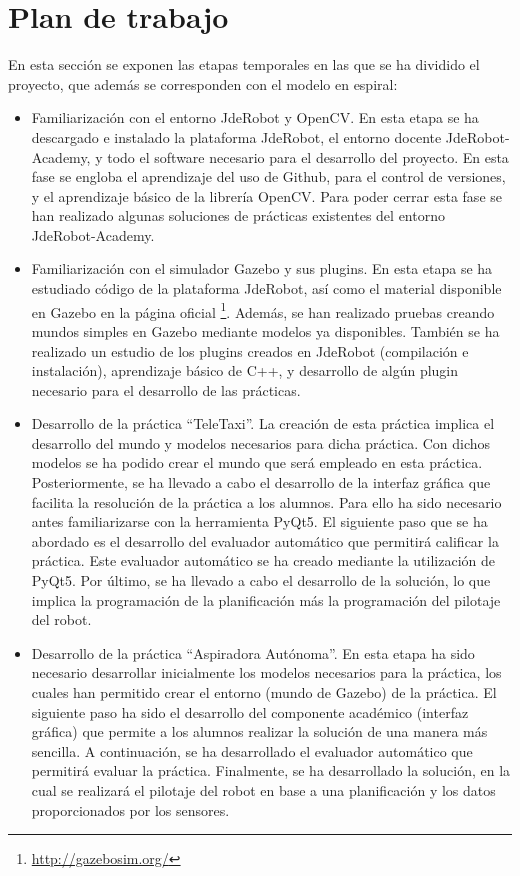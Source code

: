 \section{Plan de trabajo}
En esta sección se exponen las etapas temporales en las que se ha dividido el proyecto, que además se corresponden con el modelo en espiral:

\begin{itemize}
\item Familiarización con el entorno JdeRobot y OpenCV. En esta etapa se ha descargado e instalado la plataforma JdeRobot, el entorno docente JdeRobot-Academy, y todo el software necesario para el desarrollo del proyecto. En esta fase se engloba el aprendizaje del uso de Github, para el control de versiones, y el aprendizaje básico de la librería OpenCV. Para poder cerrar esta fase se han realizado algunas soluciones de prácticas existentes del entorno JdeRobot-Academy.
\item Familiarización con el simulador Gazebo y sus plugins. En esta etapa se ha estudiado código de la plataforma JdeRobot, así como el material disponible en Gazebo en la página oficial \footnote{\url{http://gazebosim.org/}}.  Además, se han realizado pruebas creando mundos simples en Gazebo mediante modelos ya disponibles. También se ha realizado un estudio de los plugins creados en JdeRobot (compilación e instalación), aprendizaje básico de C++, y desarrollo de algún plugin necesario para el desarrollo de las prácticas.
\item Desarrollo de la práctica ``TeleTaxi''. La creación de esta práctica implica el desarrollo del mundo y modelos necesarios para dicha práctica. Con dichos modelos se ha podido crear el mundo que será empleado en esta práctica. Posteriormente, se ha llevado a cabo el desarrollo de la interfaz gráfica que facilita la resolución de la práctica a los alumnos. Para ello ha sido necesario antes familiarizarse con la herramienta PyQt5. El siguiente paso que se ha abordado es el desarrollo del evaluador automático que permitirá calificar la práctica. Este evaluador automático se ha creado mediante la utilización de PyQt5. Por último, se ha llevado a cabo el desarrollo de la solución, lo que implica la programación de la planificación más la programación del pilotaje del robot.
\item Desarrollo de la práctica ``Aspiradora Autónoma''. En esta etapa ha sido necesario desarrollar inicialmente los modelos necesarios para la práctica, los cuales han permitido crear el entorno (mundo de Gazebo) de la práctica. El siguiente paso ha sido el desarrollo del componente académico (interfaz gráfica) que permite a los alumnos realizar la solución de una manera más sencilla. A continuación, se ha desarrollado el evaluador automático que permitirá evaluar la práctica. Finalmente, se ha desarrollado la solución, en la cual se realizará el pilotaje del robot en base a una planificación y los datos proporcionados por los sensores.

\end{itemize}
